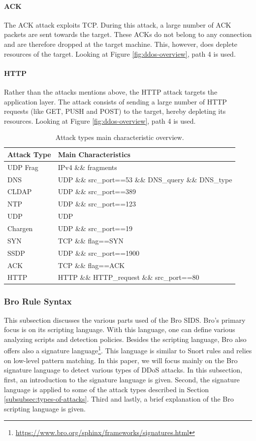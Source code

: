 \paragraph{ACK}
The ACK attack exploits TCP. During this attack, a large number of ACK packets are sent towards the target. These ACKs do not belong to any connection and are therefore dropped at the target machine. This, however, does deplete resources of the target. Looking at Figure \ref{fig:ddos-overview}, path 4 is used. 


\paragraph{HTTP}
Rather than the attacks mentions above, the HTTP attack targets the application layer. The attack consists of sending a large number of HTTP requests (like GET, PUSH and POST) to the target, hereby depleting its resources. Looking at Figure \ref{fig:ddos-overview}, path 4 is used.



\begin{table}
\centering
\begin{tabular}{l | l}
Attack Type & Main Characteristics \\ \hline \hline
UDP Frag & IPv4 \&\& fragments \\ \hline
DNS & UDP \&\& src\_port==53 \&\& DNS\_query \&\& DNS\_type \\ \hline
CLDAP & UDP \&\& src\_port==389 \\ \hline
NTP & UDP \&\& src\_port==123 \\ \hline
UDP & UDP \\ \hline
Chargen & UDP \&\& src\_port==19 \\ \hline
SYN & TCP \&\& flag==SYN \\ \hline
SSDP & UDP \&\& src\_port==1900 \\ \hline
ACK & TCP \&\& flag==ACK \\ \hline
HTTP & HTTP \&\& HTTP\_request \&\& src\_port==80
\end{tabular}
\caption{\label{tab:attack-overview}Attack types main characteristic overview.}
\end{table}


\subsubsection{Bro Rule Syntax} 
This subsection discusses the various parts used of the Bro SIDS. Bro's primary focus is on its scripting language.  With this language, one can define various analyzing scripts and detection policies. Besides the scripting language, Bro also offers also a signature language\footnote{\url{https://www.bro.org/sphinx/frameworks/signatures.html}}. This language is similar to Snort rules and relies on low-level pattern matching. In this paper, we will focus mainly on the Bro signature language to detect various types of DDoS attacks. In this subsection, first, an introduction to the signature language is given. Second, the signature language is applied to some of the attack types described in Section \ref{subsubsec:types-of-attacks}. Third and lastly, a brief explanation of the Bro scripting language is given.


